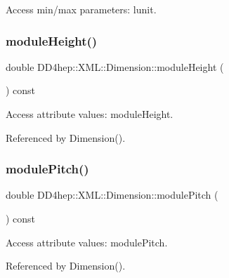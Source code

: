 Access min/max parameters\+: lunit. 

\hypertarget{struct_d_d4hep_1_1_x_m_l_1_1_dimension_ad4325caee0d536a441adf8e1eaa4ec14}{}\label{struct_d_d4hep_1_1_x_m_l_1_1_dimension_ad4325caee0d536a441adf8e1eaa4ec14} 
\subsubsection{\texorpdfstring{module\+Height()}{moduleHeight()}}
{\footnotesize\ttfamily double D\+D4hep\+::\+X\+M\+L\+::\+Dimension\+::module\+Height (\begin{DoxyParamCaption}{ }\end{DoxyParamCaption}) const}



Access attribute values\+: module\+Height. 



Referenced by Dimension().

\hypertarget{struct_d_d4hep_1_1_x_m_l_1_1_dimension_ab5aad26bedb5baea6d013919f0205aae}{}\label{struct_d_d4hep_1_1_x_m_l_1_1_dimension_ab5aad26bedb5baea6d013919f0205aae} 
\subsubsection{\texorpdfstring{module\+Pitch()}{modulePitch()}}
{\footnotesize\ttfamily double D\+D4hep\+::\+X\+M\+L\+::\+Dimension\+::module\+Pitch (\begin{DoxyParamCaption}{ }\end{DoxyParamCaption}) const}



Access attribute values\+: module\+Pitch. 



Referenced by Dimension().

\hypertarget{struct_d_d4hep_1_1_x_m_l_1_1_dimension_abb2fc4d39393a2376fa3a4a7af27ed6c}{}\label{struct_d_d4hep_1_1_x_m_l_1_1_dimension_abb2fc4d39393a2376fa3a4a7af27ed6c} 
